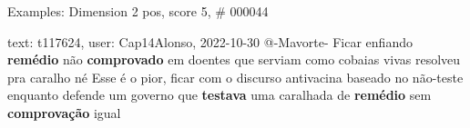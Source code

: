 \begin{frame}{Examples: Dimension 2 pos, score 5, \# 000044}
\footnotesize
\begin{exampleblock}{text: t117624, user: Cap14Alonso, 2022-10-30}
@-Mavorte- Ficar enfiando \textbf{remédio} não \textbf{comprovado} em doentes 
que serviam como cobaias vivas resolveu pra caralho né Esse é o pior, ficar com 
o discurso antivacina baseado no não-teste enquanto defende um governo que 
\textbf{testava} uma caralhada de \textbf{remédio} sem \textbf{comprovação} 
igual 
\end{exampleblock}
\end{frame}
